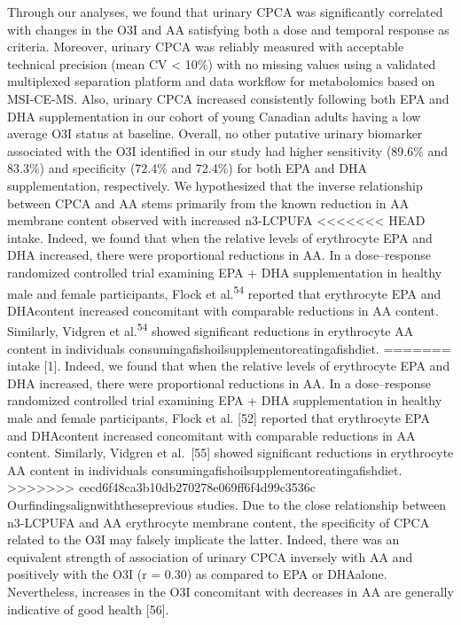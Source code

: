 \documentclass[journal=jacsat,manuscript=article]{achemso}
\begin{document}
Through our analyses, we found that urinary CPCA was significantly
correlated with changes in the O3I and AA satisfying both a dose and
temporal response as criteria. Moreover, urinary CPCA was reliably
measured with acceptable technical precision (mean CV \textless{} 10\%)
with no missing values using a validated multiplexed separation platform
and data workflow for metabolomics based on MSI-CE-MS. Also, urinary
CPCA increased consistently following both EPA and DHA supplementation
in our cohort of young Canadian adults having a low average O3I status
at baseline. Overall, no other putative urinary biomarker associated
with the O3I identified in our study had higher sensitivity (89.6\% and
83.3\%) and specificity (72.4\% and 72.4\%) for both EPA and DHA
supplementation, respectively. We hypothesized that the inverse
relationship between CPCA and AA stems primarily from the known
reduction in AA membrane content observed with increased n3-LCPUFA
<<<<<<< HEAD
intake. Indeed, we found that when the relative levels of erythrocyte
EPA and DHA increased, there were proportional reductions in AA. In a
dose--response randomized controlled trial examining EPA + DHA
supplementation in healthy male and female participants, Flock et
al.\textsuperscript{54} reported that erythrocyte EPA and DHAcontent
increased concomitant with comparable reductions in AA content.
Similarly, Vidgren et al.\textsuperscript{54} showed significant
reductions in erythrocyte AA content in individuals
consumingafishoilsupplementoreatingafishdiet.
=======
intake {[}1{]}. Indeed, we found that when the relative levels of
erythrocyte EPA and DHA increased, there were proportional reductions in
AA. In a dose--response randomized controlled trial examining EPA + DHA
supplementation in healthy male and female participants, Flock et al.
{[}52{]} reported that erythrocyte EPA and DHAcontent increased
concomitant with comparable reductions in AA content. Similarly, Vidgren
et al.~{[}55{]} showed significant reductions in erythrocyte AA content
in individuals consumingafishoilsupplementoreatingafishdiet.
>>>>>>> cecd6f48ca3b10db270278e069ff6f4d99c3536c
Ourfindingsalignwiththeseprevious studies. Due to the close relationship
between n3-LCPUFA and AA erythrocyte membrane content, the specificity
of CPCA related to the O3I may falsely implicate the latter. Indeed,
there was an equivalent strength of association of urinary CPCA
inversely with AA and positively with the O3I (r = 0.30) as compared to
EPA or DHAalone. Nevertheless, increases in the O3I concomitant with
decreases in AA are generally indicative of good health {[}56{]}.
\end{document}
